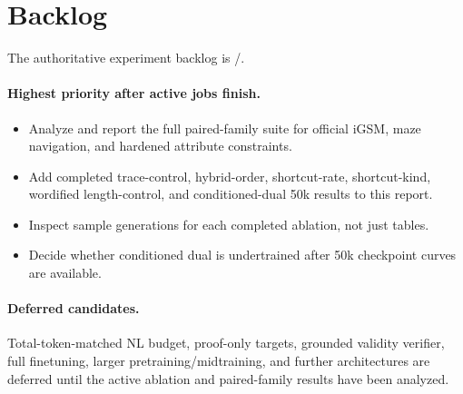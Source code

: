 \section{Backlog}

The authoritative experiment backlog is \repo{}/.

\paragraph{Highest priority after active jobs finish.}
\begin{itemize}
  \item Analyze and report the full paired-family suite for official iGSM, maze
  navigation, and hardened attribute constraints.
  \item Add completed trace-control, hybrid-order, shortcut-rate, shortcut-kind,
  wordified length-control, and conditioned-dual 50k results to this report.
  \item Inspect sample generations for each completed ablation, not just tables.
  \item Decide whether conditioned dual is undertrained after 50k checkpoint
  curves are available.
\end{itemize}

\paragraph{Deferred candidates.}
Total-token-matched NL budget, proof-only targets, grounded validity verifier,
full finetuning, larger pretraining/midtraining, and further architectures are
deferred until the active ablation and paired-family results have been analyzed.
